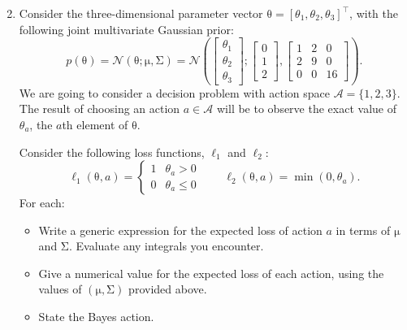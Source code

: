 \documentclass{article}
\newcommand{\mc}[1]{\mathcal{#1}}
\newcommand{\trans}{^\top}
\newcommand{\mat}[1]{\bm{\mathrm{#1}}}
\renewcommand{\vec}[1]{\bm{\mathrm{#1}}}
\begin{document}
\clearpage
\begin{enumerate}
\setcounter{enumi}{1}
\item
  Consider the three-dimensional parameter vector $\vec{\theta} =
  [\theta_1, \theta_2, \theta_3]\trans$, with the following joint
  multivariate Gaussian prior:
  \begin{equation*}
    p(\vec{\theta})
    =
    \mc{N}(\vec{\theta}; \vec{\mu}, \mat{\Sigma})
    =
    \mc{N}
    \left(
    \begin{bmatrix}
      \theta_1 \\
      \theta_2 \\
      \theta_3
    \end{bmatrix}
    ;
    \begin{bmatrix}
      0 \\
      1 \\
      2
    \end{bmatrix},
    \begin{bmatrix}
      1 & 2 & 0   \\
      2 & 9 & 0 \\
      0 & 0 & 16
    \end{bmatrix}
    \right).
  \end{equation*}
  We are going to consider a decision problem with action space
  $\mc{A} = \{1, 2, 3\}$.  The result of choosing an action $a \in
  \mc{A}$ will be to observe the exact value of $\theta_a$, the $a$th
  element of $\vec{\theta}$.

  Consider the following loss functions, $\ell_1$ and $\ell_2$:
  \begin{equation*}
    \ell_1(\vec{\theta}, a) =
    \begin{cases}
      1 & \theta_a   >  0 \\
      0 & \theta_a \leq 0
    \end{cases}
    \qquad
    \ell_2(\vec{\theta}, a) = \min(0, \theta_a).
  \end{equation*}
  For each:
  \begin{itemize}
  \item
    Write a generic expression for the expected loss of action $a$ in
    terms of $\vec{\mu}$ and $\mat{\Sigma}$.  Evaluate any integrals
    you encounter.
  \item
    Give a numerical value for the expected loss of each action, using
    the values of $(\vec{\mu}, \mat{\Sigma})$ provided above.
  \item
    State the Bayes action.
  \end{itemize}
\end{enumerate}
\end{document}

